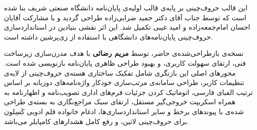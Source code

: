 %
%

\begin{thesisacknowledgments}
این قالب حروف‌چینی بر پایه‌ی قالب اولیه‌ی پایان‌نامه دانشگاه صنعتی شریف بنا شده است که توسط جناب آقای دکتر حمید ضرابی‌زاده طراحی گردید و با مشارکت آقایان احسان امام‌جمعه‌زاده و امید غیبی تکمیل شد. این اثر نقشی بنیادین در استانداردسازی حروف‌چینی پایان‌نامه‌های دانشگاهی با استفاده از زی‌پرشین داشته است.

نسخه‌ی بازطراحی‌شده‌ی حاضر، توسط \textbf{مریم رضائی} با هدف مدرن‌سازی زیرساخت فنی، ارتقای سهولت کاربری، و بهبود طراحی ظاهری پایان‌نامه بازنویسی شده است. محورهای اصلی این بازنگری شامل تفکیک ساختاری هسته‌ی حروف‌چینی از لایه‌ی تنظیمات کاربر، طراحی سامانه‌ی مرتب‌سازی خودکار واژه‌نامه‌های دوزبانه بر اساس ترتیب الفبای فارسی، اتوماتیک کردن جزئیات فرم‌های اداری تصویب‌نامه و اظهارنامه به همراه اسکریپت خروجی‌گیر مستقل، ارتقای سبک مراجع‌نگاری به بسته‌ی طراحی شده‌ی  با پیوندهای برخط و سایر استانداردسازی‌ها، ادغام خانواده قلم ادوبی کَسِلون برای حروف‌چینی لاتین، و رفع کامل هشدارهای کامپایلر می‌باشد.
\end{thesisacknowledgments}
